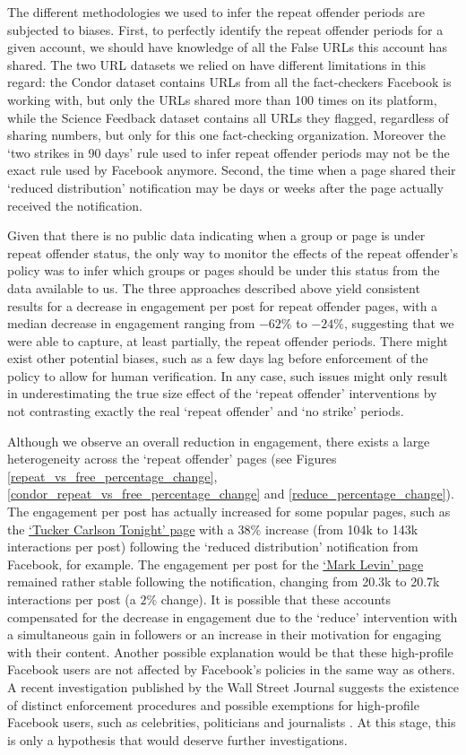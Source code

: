 \documentclass[review]{elsarticle}
\begin{document}
{{The different methodologies we used to infer the repeat offender periods are subjected to biases.
First, to perfectly identify the repeat offender periods for a given account, we should have knowledge of all the False URLs this account has shared.
The two URL datasets we relied on have different limitations in this regard: the Condor dataset contains URLs from all the fact-checkers Facebook is working with, but only the URLs shared more than 100 times on its platform, while the Science Feedback dataset contains all URLs they flagged, regardless of sharing numbers, but only for this one fact-checking organization.
Moreover the `two strikes in 90 days' rule used to infer repeat offender periods may not be the exact rule used by Facebook anymore.
Second, the time when a page shared their `reduced distribution' notification may be days or weeks after the page actually received the notification.

Given that there is no public data indicating when a group or page is under repeat offender status, the only way to monitor the effects of the repeat offender's policy was to infer which groups or pages should be under this status from the data available to us.
The three approaches described above yield consistent results for a decrease in engagement per post for repeat offender pages, with a median decrease in engagement ranging from $-62\%$ to $-24\%$, suggesting that we were able to capture, at least partially, the repeat offender periods.
There might exist other potential biases, such as a few days lag before enforcement of the policy to allow for human verification. 
In any case, such issues might only result in underestimating the true size effect of the `repeat offender' interventions by not contrasting exactly the real `repeat offender' and `no strike' periods.

Although we observe an overall reduction in engagement, there exists a large heterogeneity across the `repeat offender' pages (see Figures \ref{repeat_vs_free_percentage_change}, \ref{condor_repeat_vs_free_percentage_change} and \ref{reduce_percentage_change}). 
The engagement per post has actually increased for some popular pages, such as the \href{https://www.facebook.com/TuckerCarlsonTonight/}{`Tucker Carlson Tonight' page} with a $38\%$ increase (from 104k to 143k interactions per post) following the `reduced distribution' notification from Facebook, for example.
The engagement per post for the \href{https://www.facebook.com/marklevinshow}{`Mark Levin' page} remained rather stable following the notification, changing from 20.3k to 20.7k interactions per post (a $2\%$ change).
It is possible that these accounts compensated for the decrease in engagement due to the `reduce' intervention with a simultaneous gain in followers or an increase in their motivation for engaging with their content.
Another possible explanation would be that these high-profile Facebook users are not affected by Facebook's policies in the same way as others. 
A recent investigation published by the Wall Street Journal suggests the existence of distinct enforcement procedures and possible exemptions for high-profile Facebook users, such as celebrities, politicians and journalists \citep{WSJrevelations}. 
At this stage, this is only a hypothesis that would deserve further investigations.

}}
\end{document}
